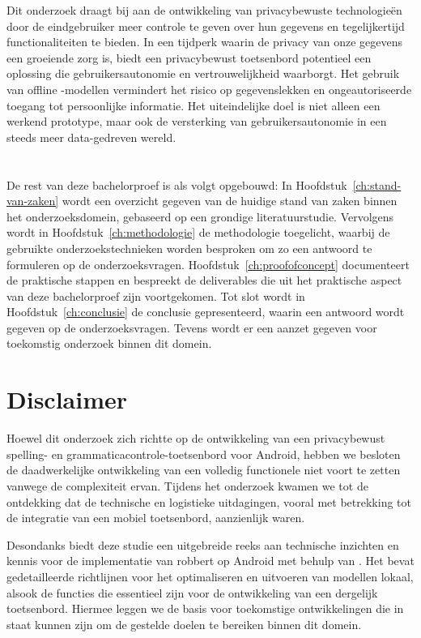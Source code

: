 Dit onderzoek draagt bij aan de ontwikkeling van privacybewuste technologieën door de eindgebruiker meer controle te geven over hun gegevens en tegelijkertijd  functionaliteiten te bieden. In een tijdperk waarin de privacy van onze gegevens een groeiende zorg is, biedt een privacybewust toetsenbord potentieel een oplossing die gebruikersautonomie en vertrouwelijkheid waarborgt. Het gebruik van offline -modellen vermindert het risico op gegevenslekken en ongeautoriseerde toegang tot persoonlijke informatie. Het uiteindelijke doel is niet alleen een werkend prototype, maar ook de versterking van gebruikersautonomie in een steeds meer data-gedreven wereld.

\section{}%
\label{sec:opzet-bachelorproef}


De rest van deze bachelorproef is als volgt opgebouwd: In Hoofdstuk~\ref{ch:stand-van-zaken} wordt een overzicht gegeven van de huidige stand van zaken binnen het onderzoeksdomein, gebaseerd op een grondige literatuurstudie. Vervolgens wordt in Hoofdstuk~\ref{ch:methodologie} de methodologie toegelicht, waarbij de gebruikte onderzoekstechnieken worden besproken om zo een antwoord te formuleren op de onderzoeksvragen. Hoofdstuk~\ref{ch:proofofconcept} documenteert de praktische stappen en bespreekt de deliverables die uit het praktische aspect van deze bachelorproef zijn voortgekomen. Tot slot wordt in Hoofdstuk~\ref{ch:conclusie} de conclusie gepresenteerd, waarin een antwoord wordt gegeven op de onderzoeksvragen. Tevens wordt er een aanzet gegeven voor toekomstig onderzoek binnen dit domein.

\section{Disclaimer}%

Hoewel dit onderzoek zich richtte op de ontwikkeling van een privacybewust spel\-ling- en grammaticacontrole-toetsenbord voor Android, hebben we besloten de daadwerkelijke ontwikkeling van een volledig functionele  niet voort te zetten vanwege de complexiteit ervan. Tijdens het onderzoek kwamen we tot de ontdekking dat de technische en logistieke uitdagingen, vooral met betrekking tot de integratie van een mobiel toetsenbord, aanzienlijk waren.

Desondanks biedt deze studie een uitgebreide reeks aan technische inzichten en kennis voor de implementatie van \gls{robbert} op Android met behulp van . Het bevat gedetailleerde richtlijnen voor het optimaliseren en uitvoeren van modellen lokaal, alsook de functies die essentieel zijn voor de ontwikkeling van een dergelijk toetsenbord. Hiermee leggen we de basis voor toekomstige ontwikkelingen die in staat kunnen zijn om de gestelde doelen te bereiken binnen dit domein.
